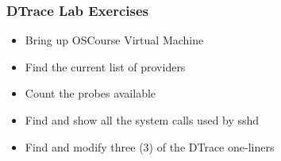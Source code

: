 \documentclass[pdftex,handout]{beamer}
\begin{document}
\begin{frame}[fragile]
  \frametitle{DTrace Lab Exercises}
  \begin{itemize}
  \item Bring up OSCourse Virtual Machine
  \item Find the current list of providers
  \item Count the probes available
  \item Find and show all the system calls used by sshd
  \item Find and modify three (3) of the DTrace one-liners
  \end{itemize}
\end{frame}
\end{document}

